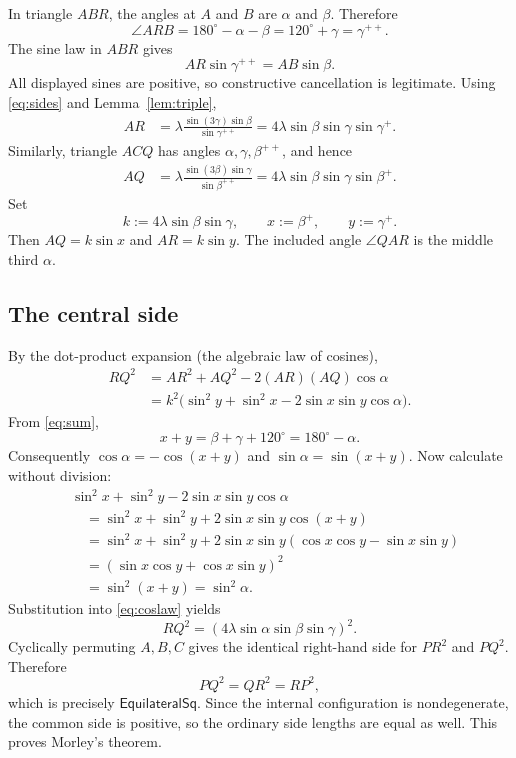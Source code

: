 \documentclass[11pt]{article}
\theoremstyle{definition}
\newcommand{\EqSq}{\mathsf{EquilateralSq}}
\begin{document}
In triangle $ABR$, the angles at $A$ and $B$ are $\alpha$ and $\beta$.
Therefore
\[
  \angle ARB=180^\circ-\alpha-\beta=120^\circ+\gamma=\gamma^{++}.
\]
The sine law in $ABR$ gives
\[
  AR\sin\gamma^{++}=AB\sin\beta.
\]
All displayed sines are positive, so constructive cancellation is legitimate.
Using \eqref{eq:sides} and Lemma~\ref{lem:triple},
\begin{align}
 AR
 &=\lambda\frac{\sin(3\gamma)\sin\beta}{\sin\gamma^{++}}
  =4\lambda\sin\beta\sin\gamma\sin\gamma^+.
 \tag{2.4}\label{eq:AR}
\end{align}
Similarly, triangle $ACQ$ has angles $\alpha,\gamma,\beta^{++}$, and hence
\begin{align}
 AQ
 &=\lambda\frac{\sin(3\beta)\sin\gamma}{\sin\beta^{++}}
  =4\lambda\sin\beta\sin\gamma\sin\beta^+.
 \tag{2.5}\label{eq:AQ}
\end{align}
Set
\[
 k:=4\lambda\sin\beta\sin\gamma,
 \qquad x:=\beta^+,
 \qquad y:=\gamma^+.
 \tag{2.6}\label{eq:kxy}
\]
Then $AQ=k\sin x$ and $AR=k\sin y$.  The included angle $\angle QAR$ is the
middle third $\alpha$.

\subsection{The central side}
By the dot-product expansion (the algebraic law of cosines),
\begin{align*}
 RQ^2
 &=AR^2+AQ^2-2(AR)(AQ)\cos\alpha\\
 &=k^2\bigl(\sin^2y+\sin^2x-2\sin x\sin y\cos\alpha\bigr).
 \tag{2.7}\label{eq:coslaw}
\end{align*}
From \eqref{eq:sum},
\[
 x+y=\beta+\gamma+120^\circ=180^\circ-\alpha.
\]
Consequently $\cos\alpha=-\cos(x+y)$ and
$\sin\alpha=\sin(x+y)$.  Now calculate without division:
\begin{align*}
&\sin^2x+\sin^2y-2\sin x\sin y\cos\alpha\\
&\quad=\sin^2x+\sin^2y+2\sin x\sin y\cos(x+y)\\
&\quad=\sin^2x+\sin^2y
   +2\sin x\sin y(\cos x\cos y-\sin x\sin y)\\
&\quad=(\sin x\cos y+\cos x\sin y)^2\\
&\quad=\sin^2(x+y)=\sin^2\alpha.
\tag{2.8}\label{eq:bracket}
\end{align*}
Substitution into \eqref{eq:coslaw} yields
\[
  RQ^2=(4\lambda\sin\alpha\sin\beta\sin\gamma)^2.
  \tag{2.9}\label{eq:RQ}
\]
Cyclically permuting $A,B,C$ gives the identical right-hand side for $PR^2$
and $PQ^2$.  Therefore
\[
  PQ^2=QR^2=RP^2,
\]
which is precisely $\EqSq$.  Since the internal configuration is
nondegenerate, the common side is positive, so the ordinary side lengths are
equal as well.  This proves Morley's theorem.
\end{document}
